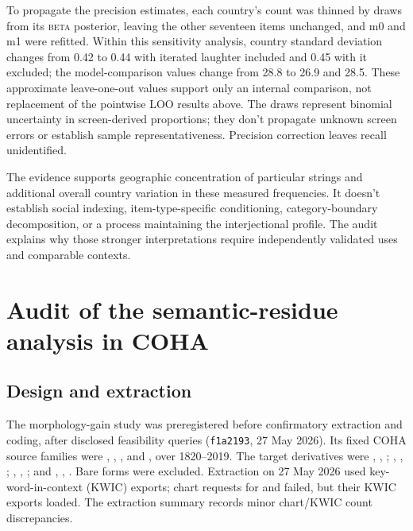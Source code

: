 \documentclass[12pt]{article}
\begin{document}
To propagate the  precision estimates, each country's count was thinned by draws from its \textsc{beta} posterior, leaving the other seventeen items unchanged, and m0 and m1 were refitted. Within this sensitivity analysis, country standard deviation changes from 0.42 to 0.44 with iterated laughter included and 0.45 with it excluded; the model-comparison values change from 28.8 to 26.9 and 28.5. These approximate leave-one-out values support only an internal comparison, not replacement of the pointwise LOO results above. The draws represent binomial uncertainty in screen-derived proportions; they don't propagate unknown screen errors or establish sample representativeness. Precision correction leaves recall unidentified.

The evidence supports geographic concentration of particular strings and additional overall country variation in these measured frequencies. It doesn't establish social indexing, item-type-specific conditioning, category-boundary decomposition, or a process maintaining the interjectional profile. The audit explains why those stronger interpretations require independently validated uses and comparable contexts.

\clearpage

\section[Semantic residue in COHA]{Audit of the semantic-residue analysis in COHA}
\label{app:morphgain}

\subsection{Design and extraction}

The morphology-gain study was preregistered before confirmatory extraction and coding, after disclosed feasibility queries (\texttt{f1a2193}, 27 May 2026). Its fixed COHA source families were , , , and , over 1820--2019. The target derivatives were , , ; , , ; , , ; and , , . Bare forms were excluded. Extraction on 27 May 2026 used key-word-in-context (KWIC) exports; chart requests for  and  failed, but their KWIC exports loaded. The extraction summary records minor chart/KWIC count discrepancies.
\end{document}
